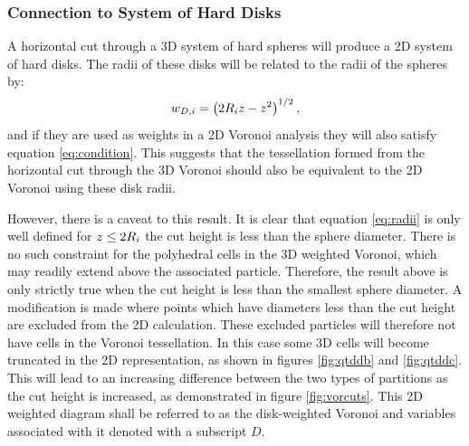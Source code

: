 \subsubsection{Connection to System of Hard Disks}

A horizontal cut through a 3D system of hard spheres will produce a 2D system of hard disks.
The radii of these disks will be related to the radii of the spheres by:
\begin{equation}
	\label{eq:radii}
	w_{D,i}  = \left(2R_i z-z^2\right)^{1/2},
\end{equation}
and if they are used as weights in a 2D Voronoi analysis they will also satisfy equation \eqref{eq:condition}.
This suggests that the tessellation formed from the horizontal cut through the 3D Voronoi should also be equivalent to the 2D Voronoi using these disk radii.

However, there is a caveat to this result. 
It is clear that equation \eqref{eq:radii} is only well defined for $z\leq 2R_i$ \ie{} the cut height is less than the sphere diameter.
There is no such constraint for the polyhedral cells in the 3D weighted Voronoi, which may readily extend above the associated particle.
Therefore, the result above is only strictly true when the cut height is less than the smallest sphere diameter.
A modification is made where points which have diameters less than the cut height are excluded from the 2D calculation.
These excluded particles will therefore not have cells in the Voronoi tessellation.
In this case some 3D cells will become truncated in the 2D representation, as shown in figures \ref{fig:qtddb} and \ref{fig:qtddc}.
This will lead to an increasing difference between the two types of partitions as the cut height is increased, as demonstrated in figure \ref{fig:vorcuts}.
This 2D weighted diagram shall be referred to as the disk\--weighted Voronoi and variables associated with it denoted with a subscript $D$.

